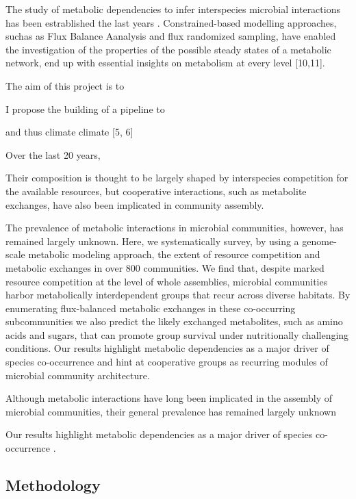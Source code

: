 \documentclass{article}
\begin{document}
The study of metabolic dependencies to infer interspecies microbial interactions has been estrablished the last years \cite{zelezniak2015metabolic}.
Constrained-based modelling approaches, suchas as Flux Balance Aanalysis and flux randomized sampling, have enabled the investigation of the properties of the possible steady states of a metabolic network,
end up with essential insights on metabolism at every level [10,11].


The aim of this project is to 




I propose the building of a pipeline to 


and thus climate \cite{arrigo2005marine}
 climate [5, 6]


Over the last 20 years, 



Their composition is thought to be largely shaped by interspecies competition for the
available resources, but cooperative interactions, such as metabolite
exchanges, have also been implicated in community assembly. 

The prevalence of metabolic interactions in microbial communities, 
however, has remained largely unknown. Here, we systematically survey,
by using a genome-scale metabolic modeling approach, the extent
of resource competition and metabolic exchanges in over 800
communities. We find that, despite marked resource competition
at the level of whole assemblies, microbial communities harbor
metabolically interdependent groups that recur across diverse habitats. By enumerating flux-balanced metabolic exchanges in these
co-occurring subcommunities we also predict the likely exchanged
metabolites, such as amino acids and sugars, that can promote group
survival under nutritionally challenging conditions. Our results
highlight metabolic dependencies as a major driver of species
co-occurrence and hint at cooperative groups as recurring modules
of microbial community architecture.


Although metabolic interactions have long been implicated in
the assembly of microbial communities, their general prevalence has remained largely unknown

Our results highlight metabolic dependencies as a major driver of species
co-occurrence \cite{zelezniak2015metabolic}.





\subsection{Methodology}
\end{document}
